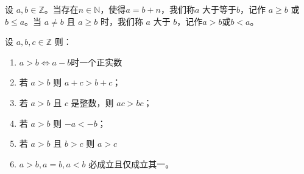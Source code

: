 \begin{definition}
	设 $a,b\in \mathbb Z$。当存在$n\in \mathbb N$，使得$a=b+n$，我们称$a$ 大于等于$b$，记作 $a \ge b$ 或 $b \le a$。当 $a \ne b$ 且 $a\ge b$ 时，我们称 $a$ 大于 $b$，记作$a>b$或$b<a$。
\end{definition}

\begin{theorem}[整数的序的性质]
	设 $a,b,c\in \mathbb Z$ 则：
	\begin{enumerate}
		\item $a> b\iff a-b$时一个正实数
		\item 若 $a>b$ 则 $a+c>b+c$；
		\item 若 $a>b$ 且 $c$ 是整数，则 $ac>bc$；
		\item 若 $a>b$ 则 $-a<-b$；
		\item 若 $a>b$ 且 $b>c$ 则 $a>c$
		\item $a>b,a=b,a<b$ 必成立且仅成立其一。
	\end{enumerate}
\end{theorem}











